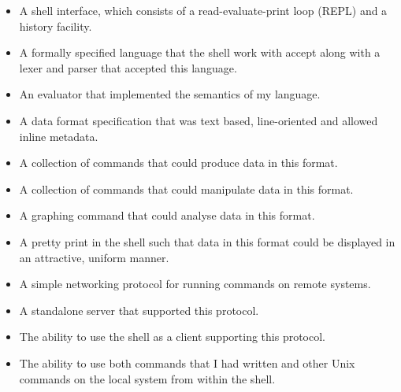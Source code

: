 \documentclass[12pt,twoside,notitlepage]{report}
\begin{document}
\begin{itemize}
\item A shell interface, which consists of a read-evaluate-print loop
  (REPL) and a history facility.
\item A formally specified language that the shell work with accept along
  with a lexer and parser that accepted this language.
\item An evaluator that implemented the semantics of my language.
\item A data format specification that was text based, line-oriented
  and allowed inline metadata.
\item A collection of commands that could produce data in this format.
\item A collection of commands that could manipulate data in this
  format.
\item A graphing command that could analyse data in this format.
\item A pretty print in the shell such that data in this format could
  be displayed in an attractive, uniform manner.
\item A simple networking protocol for running commands on remote
  systems.
\item A standalone server that supported this protocol.
\item The ability to use the shell as a client supporting this
  protocol.
\item The ability to use both commands that I had written and other
  Unix commands on the local system from within the shell.
\end{itemize}



\end{document}
